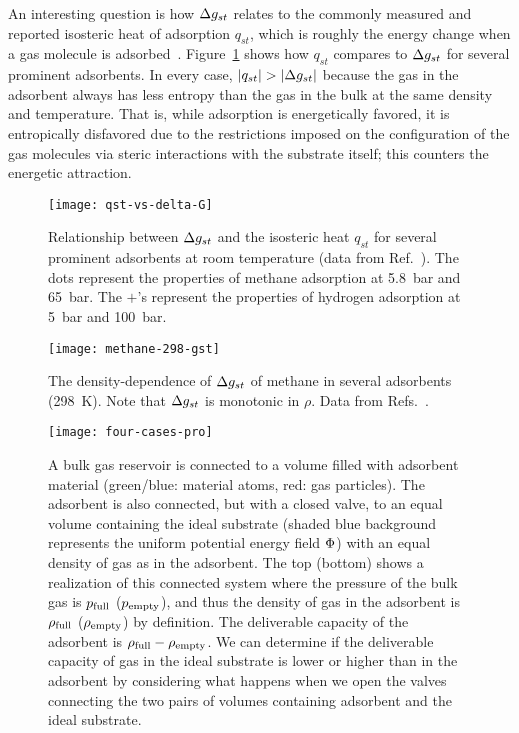 An interesting question is how $\Delta g_{st}$ relates to the commonly measured and
reported isosteric heat of adsorption $q_{st}$, which is roughly the energy
change when a gas molecule is adsorbed~\cite{sircar1999isosteric,
tian2017differential}. Figure~\ref{fig:qst-vs-delta-G} shows how $q_{st}$
compares to $\Delta g_{st}$ for several prominent adsorbents. In every case,
$|q_{st}|>|\gst|$ because the gas in the adsorbent always has less entropy than
the gas in the bulk at the same density and temperature. That is, while
adsorption is energetically favored, it is entropically disfavored due to the
restrictions imposed on the configuration of the gas molecules via steric
interactions with the substrate itself; this counters the energetic attraction.

\begin{figure}
    \centering
    \texttt{[image: qst-vs-delta-G]}
    \caption{Relationship between $\Delta g_{st}$ and the isosteric heat
      $q_{st}$ for several prominent adsorbents at room
      temperature (data from Ref.~\cite{mason2014evaluating, garcia2018benchmark}). The dots represent the properties of methane
      adsorption at 5.8~bar and 65~bar. The $+$'s represent the
      properties of hydrogen adsorption at 5~bar and
      100~bar.}
    \label{fig:qst-vs-delta-G}
\end{figure}

\begin{figure}
    \centering
    \texttt{[image: methane-298-gst]}
    \caption{The density-dependence of $\Delta g_{st}$ of methane in several
      adsorbents (298\ K). Note that $\Delta g_{st}$ is monotonic in
      $\rho$. Data from
      Refs.~\cite{mason2014evaluating, furukawa2009storage}.
    }
    \label{fig:methane-gst}
\end{figure}

\begin{figure}
\centering
\texttt{[image: four-cases-pro]}
\caption{A bulk gas reservoir is connected to a volume filled with adsorbent material (green/blue: material atoms, red: gas particles). The adsorbent is also connected, but with a closed valve, to an equal volume containing the ideal substrate (shaded blue background represents the uniform potential energy field $\Phi$) with an equal density of gas as in the adsorbent. The top (bottom) shows a realization of this connected system where the pressure of the bulk gas is $p_{\text{full}}$ ($p_{\text{empty}}$), and thus the density of gas in the adsorbent is $\rho_{\text{full}}$ ($\rho_{\text{empty}}$) by definition. The deliverable capacity of the adsorbent is $\rho_{\text{full}} - \rho_{\text{empty}}$. We can determine if the deliverable capacity of gas in the ideal substrate is lower or higher than in the adsorbent by considering what happens when we open the valves connecting the two pairs of volumes containing adsorbent and the ideal substrate.}
\label{fig:delta-gst-maximum}
\end{figure}

